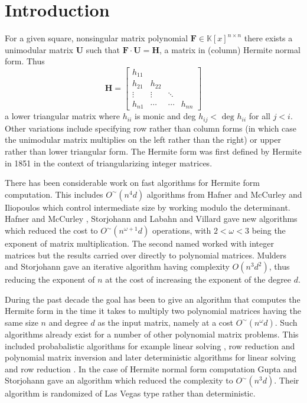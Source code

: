 
\section{Introduction}

For a given square, nonsingular matrix polynomial $\mathbf{F}\in\mathbb{K}[x]^{n\times n}$
there exists a unimodular matrix $\mathbf{U}$ such that $\mathbf{F}\cdot\mathbf{U}=\mathbf{H}$,
a matrix in (column) Hermite normal form. Thus 
\[
\mathbf{H}=\left[\begin{array}{cccc}
h_{11}\\
h_{21} & h_{22}\\
\vdots & \vdots & \ddots\\
h_{n1} & \cdots & \cdots & h_{nn}
\end{array}\right]
\]
 a lower triangular matrix where $h_{ii}$ is monic and deg $h_{ij}<\mbox{ deg }h_{ii}$
for all $j<i$. Other variations include specifying row rather than
column forms (in which case the unimodular matrix multiplies on the
left rather than the right) or upper rather than lower triangular
form. The Hermite form was first defined by Hermite in 1851 in the
context of triangularizing integer matrices.

There has been considerable work on fast algorithms for Hermite form
computation. This includes $O^{\sim}\left(n^{4}d\right)$ algorithms
from Hafner and McCurley \citep{hafner} and Iliopoulos \citep{iliopoulos}
which control intermediate size by working modulo the determinant.
Hafner and McCurley \citep{hafner}, Storjohann and Labahn \citep{storjohann-labahn96}
and Villard \citep{villard96} gave new algorithms which reduced the
cost to $O^{\sim}\left(n^{\omega+1}d\right)$ operations, with $2<\omega<3$
being the exponent of matrix multiplication. The second named worked
with integer matrices but the results carried over directly to polynomial
matrices. Mulders and Storjohann \citep{mulders-storjohann:2003}
gave an iterative algorithm having complexity $O\left(n^{3}d^{2}\right)$,
thus reducing the exponent of $n$ at the cost of increasing the exponent
of the degree $d$.

During the past decade the goal has been to give an algorithm that
computes the Hermite form in the time it takes to multiply two polynomial
matrices having the same size $n$ and degree $d$ as the input matrix,
namely at a cost $O^{\sim}\left(n^{\omega}d\right)$. Such algorithms
already exist for a number of other polynomial matrix problems. This
included probabalistic algorithms for example linear solving \citep{mulders-storjohann:2003},
row reduction \citep{Giorgi2003} and polynomial matrix inversion
\citep{jeannerod-villard:05} and later deterministic algorithms for
linear solving and row reduction \citep{GSSV2012}. In the case of
Hermite normal form computation Gupta and Storjohann \citep{GS2011}
gave an algorithm which reduced the complexity to $O^{\sim}\left(n^{3}d\right)$.
Their algorithm is randomized of Las Vegas type rather than deterministic.

